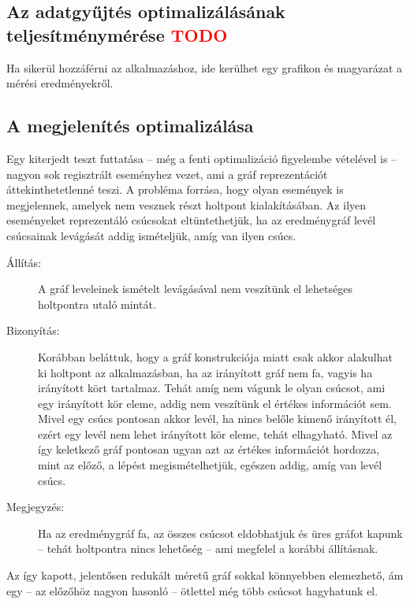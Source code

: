     \subsection{Az adatgyűjtés optimalizálásának teljesítménymérése \textcolor{red}{TODO}}
    Ha sikerül hozzáférni az alkalmazáshoz, ide kerülhet egy grafikon és magyarázat a mérési eredményekről. %
    
    \subsection{A megjelenítés optimalizálása}
    Egy kiterjedt teszt futtatása -- még a fenti optimalizáció figyelembe vételével is --nagyon sok regisztrált eseményhez vezet, ami a gráf reprezentációt áttekinthetetlenné teszi. A probléma forrása, hogy olyan események is megjelennek, amelyek nem vesznek részt holtpont kialakításában. Az ilyen eseményeket reprezentáló csúcsokat eltüntethetjük, ha az eredménygráf levél csúcsainak levágását addig ismételjük, amíg van ilyen csúcs.
    
    \begin{description}
        \item[Állítás:] A gráf leveleinek ismételt levágásával nem veszítünk el lehetséges holtpontra utaló mintát.
        \item[Bizonyítás:] Korábban beláttuk, hogy a gráf konstrukciója miatt csak akkor alakulhat ki holtpont az alkalmazásban, ha az irányított gráf nem fa, vagyis ha irányított kört tartalmaz. Tehát amíg nem vágunk le olyan csúcsot, ami egy irányított kör eleme, addig nem veszítünk el értékes információt sem. Mivel egy csúcs pontosan akkor levél, ha nincs belőle kimenő irányított él, ezért egy levél nem lehet irányított kör eleme, tehát elhagyható. Mivel az így keletkező gráf pontosan ugyan azt az értékes információt hordozza, mint az előző, a lépést megismételhetjük, egészen addig, amíg van levél csúcs.
        \item[Megjegyzés:] Ha az eredménygráf fa, az összes csúcsot eldobhatjuk és üres gráfot kapunk -- tehát holtpontra nincs lehetőség -- ami megfelel a korábbi állításnak.
    \end{description}
%    
    Az így kapott, jelentősen redukált méretű gráf sokkal könnyebben elemezhető, ám egy -- az előzőhöz nagyon hasonló -- ötlettel még több csúcsot hagyhatunk el.
    
